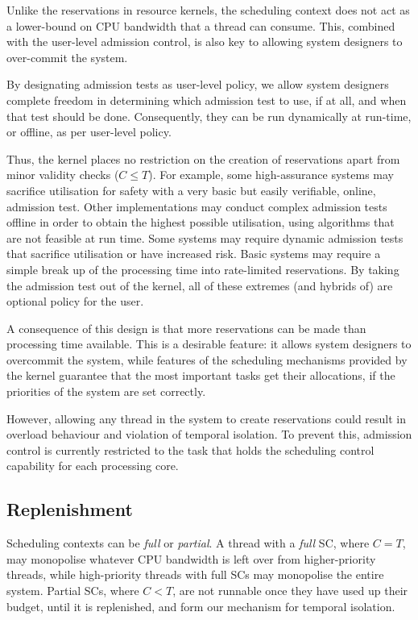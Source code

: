 Unlike the reservations in resource kernels, the scheduling context does not 
act as a lower-bound on CPU bandwidth that a thread can consume. This, combined with the
user-level admission control, is also key to allowing system designers to over-commit the system. 

By designating admission tests as user-level policy, we allow system designers complete freedom
in determining which admission test to use, if at all, and when that test should be done.
Consequently, they can be run dynamically at run-time, or offline, as per user-level policy.

Thus, the kernel places no restriction on the creation of reservations apart from minor validity
checks (\ie $C \leq T$).
For example, some high-assurance systems may sacrifice utilisation for safety with a very basic but easily verifiable, online, admission test.
Other implementations may conduct complex admission tests offline in order to obtain the highest possible utilisation, using algorithms that are not feasible at run time.
Some systems may require dynamic admission tests that sacrifice utilisation or have increased risk.
Basic systems may require a simple break up of the processing time into rate-limited reservations.
By taking the admission test out of the kernel, all of these extremes (and hybrids of) are optional policy for the user.

A consequence of this design is that more reservations can be made than processing time available.
This is a desirable feature: it allows system designers to overcommit the system, while features of the scheduling mechanisms provided by the kernel guarantee that the most important tasks get their allocations, if the priorities of the system are set correctly.

However, allowing any thread in the system to create reservations could result in overload behaviour and violation of temporal isolation.
To prevent this, admission control is currently restricted to the task that holds the scheduling
control capability for each processing core.

\subsection{Replenishment}

Scheduling contexts can be \emph{full} or \emph{partial}. A thread with a \emph{full} SC, where
\(C=T\), may monopolise whatever
CPU bandwidth is left over from higher-priority threads, while high-priority threads with full
\glspl{SC} may monopolise the entire system. 
Partial \glspl{SC}, where \(C<T\), are not runnable once
they have used up their budget, until it is replenished, and form our mechanism for temporal
isolation.  

